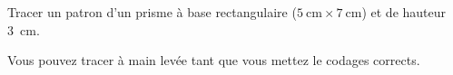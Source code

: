 
\begin{exercice}\label{exo2smath-0317}

    Tracer un patron d'un prisme à base rectangulaire ($\SI{5}{\centi\meter}\times \SI{7}{\centi\meter}$) et de hauteur \SI{3}{\centi\meter}.

    Vous pouvez tracer à main levée tant que vous mettez le codages corrects.

\end{exercice}
